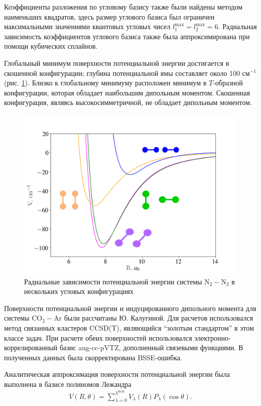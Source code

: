 Коэффициенты разложения по угловому базису также были найдены методом наименьших квадратов, здесь размер углового базиса был ограничен максимальными значениями квантовых угловых чисел $l_1^\text{max} = l_2^\text{max} = 6$. Радиальная зависимость коэффициентов углового базиса также была аппроксимирована при помощи кубических сплайнов. \par
Глобальный минимум поверхности потенциальной энергии достигается в скошенной конфигурации; глубина потенциальной ямы составляет около 100 см$^{-1}$ (рис. \ref{fig:n2n2-potential-curves}). Близко к глобальному минимуму расположен минимум в $T$-образной конфигурации, которая обладает наибольшим дипольным моментом. Скошенная конфигурация, являясь высокосимметричной, не обладает дипольным моментом. 

\setcounter{figure}{8}
\begin{figure}[H]
    \centering
    \includegraphics[width=0.75\linewidth]{./pictures/n2n2_potential.png}
    \caption{Радиальные зависимости потенциальной энергии системы N$_2-$N$_2$ в нескольких угловых конфигурациях}
    \label{fig:n2n2-potential-curves}
\end{figure}

Поверхности потенциальной энергии и индуцированного дипольного момента для системы CO$_2-$Ar были рассчитаны Ю. Калугиной. Для расчетов использовался метод связанных кластеров CCSD(T), являющийся \enquote{золотым стандартом} в этом классе задач. При расчете обеих поверхностей использовался электронно-коррелированный базис aug-cc-pVTZ, дополненный связевыми функциями. В полученных данных была скорректирована BSSE-ошибка. \par
Аналитическая аппроксимация поверхности потенциальной энергии была выполнена в базисе полиномов Лежандра
\begin{gather}
    V(R, \theta) = \sum_{\lambda = 0}^{\lambda^\text{max}} V_\lambda(R) P_\lambda(\cos \theta). \label{co2-ar-expansion}
\end{gather}

